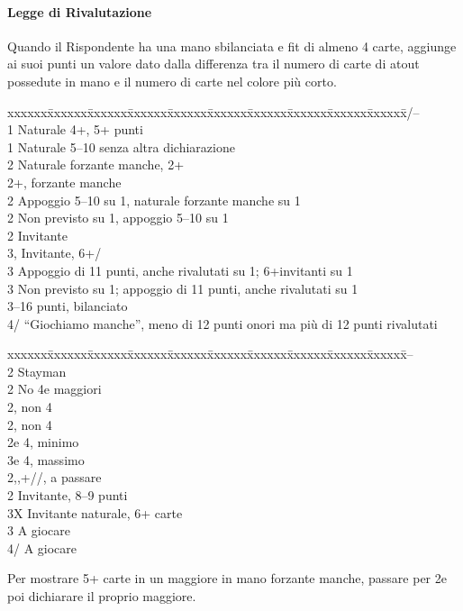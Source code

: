 \documentclass[a4paper,italian,12pt]{article}
\newcommand\SA{{\smaller{SA}}\xspace}
\newenvironment{bidtable}
{\begin{tabbing}

    xxxxxx\=xxxxxx\=xxxxxx\=xxxxxx\=xxxxxx\=xxxxxx\=xxxxxx\=xxxxxx\=xxxxxx\=xxxxxx\=\kill}
{\end{tabbing} }%
\begin{document}
\paragraph{Legge di Rivalutazione}
Quando il Rispondente ha una mano sbilanciata e fit di almeno 4 carte, aggiunge ai suoi punti un valore dato dalla
differenza tra il numero di carte di atout possedute in mano e il numero di carte nel colore più corto.

\begin{bidtable}
    1\He/\Sp--\+\\
    1\Sp \> \> Naturale 4+\Sp, 5+ punti \\
    1\SA \> Naturale 5--10 senza altra dichiarazione \\
    2\Cl \>\> Naturale forzante manche, 2+\Cl\\
    2\Di \>+\Di, forzante manche\\
    2\He \>\> Appoggio 5--10 su 1\He, naturale forzante manche su 1\Sp\\
    2\Sp\>\> Non previsto su 1\He, appoggio 5--10 su 1\Sp\\
    2\SA \>\> Invitante\\
    3\Cl,\Di \>\> Invitante, 6+\Cl/\Di\\
    3\He \>\> Appoggio di 11 punti, anche rivalutati su 1\He; 6+\He invitanti su 1\Sp\\
    3\Sp \>\> Non previsto su 1\He; appoggio di 11 punti, anche rivalutati su 1\Sp\\
    3\SA \>--16 punti, bilanciato\\
    4\He/\Sp \>\> ``Giochiamo manche'', meno di 12 punti onori ma più di 12 punti rivalutati
\end{bidtable}
\newpage

\begin{bidtable}
    1\SA--\+\\
    2\Cl\>\> Stayman\+\+\\
    2\Di\> No 4e maggiori\\
    2\He {}\He, non 4\Sp\\
    2\Sp {}\Sp, non 4\He\\
    2\SA {}\He e 4\Sp, minimo\\
    3\Cl {}\He e 4\Sp, massimo\-\-\\
    2\Di,\He,\Sp \>+\Di/\He/\Sp, a passare\\
    2\SA \>\> Invitante, 8--9 punti\\
    3X \>\> Invitante naturale, 6+ carte\\
    3\SA \>\> A giocare\\
    4\He/\Sp \>\> A giocare
\end{bidtable}
Per mostrare 5+ carte in un maggiore in mano forzante manche, passare per 2\Cl e poi dichiarare il proprio maggiore.
\end{document}
